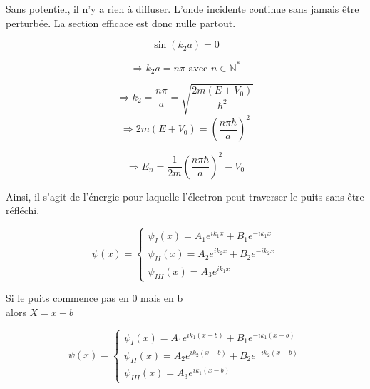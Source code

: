 \documentclass[12pt,a4paper]{article}
\begin{document}
Sans potentiel, il n'y a rien à diffuser. L'onde incidente continue sans jamais être perturbée.
La section efficace est donc nulle partout.

\[
\sin(k_2 a) = 0
\]

\[
\Rightarrow k_2 a = n\pi \text{ avec } n \in \mathbb{N}^*
\]

\[
\Rightarrow k_2 = \frac{n\pi}{a} = \sqrt{\frac{2m(E+V_0)}{\hbar^2}}
\]
\[
\Rightarrow 2m(E+V_0) = \left(\frac{n\pi\hbar}{a}\right)^2
\]

\[
\Rightarrow E_n = \frac{1}{2m}\left(\frac{n\pi\hbar}{a}\right)^2 - V_0
\]

Ainsi, il s'agit de l'énergie pour laquelle l'électron peut traverser le puits sans être réfléchi.

\[
\psi(x) = \begin{cases}
\psi_I(x) = A_1e^{ik_1x} + B_1e^{-ik_1x} \\
\psi_{II}(x) = A_2e^{ik_2x} + B_2e^{-ik_2x} \\
\psi_{III}(x) = A_3e^{ik_1x}
\end{cases}
\]

Si le puits commence pas en 0 mais en b\\
alors $X = x-b$

\[
\psi(x) = \begin{cases}
\psi_I(x) = A_1e^{ik_1(x-b)} + B_1e^{-ik_1(x-b)} \\
\psi_{II}(x) = A_2e^{ik_2(x-b)} + B_2e^{-ik_2(x-b)} \\
\psi_{III}(x) = A_3e^{ik_1(x-b)}
\end{cases}
\]
\end{document}
